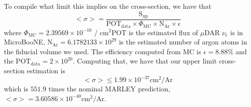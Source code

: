 To compile what limit this implies on the cross-section, we have that
\begin{equation}
    <\sigma> = \frac{\textrm{S}_{\textrm{up}}}{\textrm{POT}_\textrm{data}\times\Phi_{\textrm{MC}}\times\textrm{N}_\textrm{Ar}\times \epsilon}
\end{equation}
where $\Phi_{\textrm{MC}} = 2.39569\times 10^{-10}$ / cm$^2$POT is the estimated flux of $\mu$DAR $\nu_e$ is in MicroBooNE, $\textrm{N}_\textrm{Ar} = 6.1782133\times 10^{29}$ is the estimated number of argon atoms in the fiducial volume we used. The efficiency computed from MC is $\epsilon=8.88\%$ and the $\textrm{POT}_\textrm{data} = 2\times 10^{20}$. Computing that, we have that our upper limit cross-section estimation is 
\begin{equation}
    <\sigma> \leq 1.99\times10^{-37} \textrm{cm}^2 / \textrm{Ar}
\end{equation}
which is $551.9$ times the nominal MARLEY prediction,  $<\sigma> = 3.60586\times 10^{-40} \textrm{cm}^2 / \textrm{Ar}$.